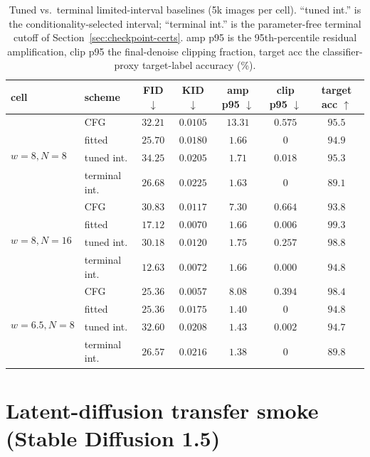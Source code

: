 \documentclass{article} %
\theoremstyle{plain}
\theoremstyle{definition}
\theoremstyle{remark}
\begin{document}
\begin{table}[t]
\centering
\caption{Tuned vs.\ terminal limited-interval baselines (5k images per cell).
``tuned int.'' is the conditionality-selected interval; ``terminal int.'' is the
parameter-free terminal cutoff of Section~\ref{sec:checkpoint-certs}.  amp p95 is
the 95th-percentile residual amplification, clip p95 the final-denoise clipping
fraction, target acc the classifier-proxy target-label accuracy (\%).}
\label{tab:interval}
{\small
\begin{tabular}{llccccc}
\toprule
cell & scheme & FID $\downarrow$ & KID $\downarrow$ & amp p95 $\downarrow$ & clip p95 $\downarrow$ & target acc $\uparrow$ \\
\midrule
\multirow{4}{*}{$w{=}8,N{=}8$}
 & CFG           & $32.21$ & $0.0105$ & $13.31$ & $0.575$ & $95.5$ \\
 & fitted        & $25.70$ & $0.0180$ & $1.66$  & $0$     & $94.9$ \\
 & tuned int.    & $34.25$ & $0.0205$ & $1.71$  & $0.018$ & $95.3$ \\
 & terminal int. & $26.68$ & $0.0225$ & $1.63$  & $0$     & $89.1$ \\
\midrule
\multirow{4}{*}{$w{=}8,N{=}16$}
 & CFG           & $30.83$ & $0.0117$ & $7.30$  & $0.664$ & $93.8$ \\
 & fitted        & $17.12$ & $0.0070$ & $1.66$  & $0.006$ & $99.3$ \\
 & tuned int.    & $30.18$ & $0.0120$ & $1.75$  & $0.257$ & $98.8$ \\
 & terminal int. & $12.63$ & $0.0072$ & $1.66$  & $0.000$ & $94.8$ \\
\midrule
\multirow{4}{*}{$w{=}6.5,N{=}8$}
 & CFG           & $25.36$ & $0.0057$ & $8.08$  & $0.394$ & $98.4$ \\
 & fitted        & $25.36$ & $0.0175$ & $1.40$  & $0$     & $94.8$ \\
 & tuned int.    & $32.60$ & $0.0208$ & $1.43$  & $0.002$ & $94.7$ \\
 & terminal int. & $26.57$ & $0.0216$ & $1.38$  & $0$     & $89.8$ \\
\bottomrule
\end{tabular}}
\end{table}
\FloatBarrier

\section{Latent-diffusion transfer smoke (Stable Diffusion 1.5)}
\label{app:ldm}
\end{document}
